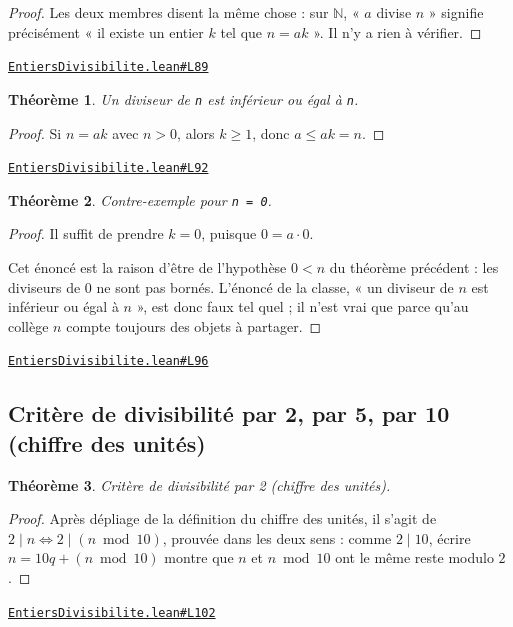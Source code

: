 \documentclass[11pt,a4paper]{article}
\theoremstyle{definition}
\theoremstyle{plain}
\newtheorem{theoreme}{Théorème}
\newcommand{\source}[2]{\par\smallskip\noindent\hfill{\footnotesize\href{#1}{\texttt{#2}}}\par\smallskip}
\begin{document}
\begin{proof}
Les deux membres disent la même chose : sur $\mathbb{N}$, « $a$ divise $n$ » signifie
précisément « il existe un entier $k$ tel que $n = ak$ ». Il n'y a rien à vérifier.
\end{proof}
\source{https://github.com/Commutator-IO/learn-lean/blob/main/cours/01-college/01-nombres-et-calculs/EntiersDivisibilite.lean\#L89}{EntiersDivisibilite.lean\#L89}

\begin{theoreme}
Un diviseur de \texttt{n} est inférieur ou égal à \texttt{n}.
\end{theoreme}

\begin{proof}
Si $n = ak$ avec $n > 0$,
alors $k \ge 1$, donc $a \le ak = n$.
\end{proof}
\source{https://github.com/Commutator-IO/learn-lean/blob/main/cours/01-college/01-nombres-et-calculs/EntiersDivisibilite.lean\#L92}{EntiersDivisibilite.lean\#L92}

\begin{theoreme}
Contre-exemple pour \texttt{n = 0}.
\end{theoreme}

\begin{proof}
Il suffit de prendre $k = 0$, puisque $0 = a \cdot 0$.

Cet énoncé est la raison d'être de l'hypothèse $0 < n$ du théorème précédent : les
diviseurs de $0$ ne sont pas bornés. L'énoncé de la classe, « un diviseur de $n$ est
inférieur ou égal à $n$ », est donc faux tel quel ; il n'est vrai que parce qu'au
collège $n$ compte toujours des objets à partager.
\end{proof}
\source{https://github.com/Commutator-IO/learn-lean/blob/main/cours/01-college/01-nombres-et-calculs/EntiersDivisibilite.lean\#L96}{EntiersDivisibilite.lean\#L96}

\subsection{Critère de divisibilité par 2, par 5, par 10 (chiffre des unités)}

\begin{theoreme}
Critère de divisibilité par 2 (chiffre des unités).
\end{theoreme}

\begin{proof}
Après dépliage de la définition du chiffre des unités, il s'agit de
$2 \mid n \iff 2 \mid (n \bmod 10)$, prouvée dans les deux sens : comme $2 \mid 10$, écrire $n = 10q + (n \bmod 10)$ montre que $n$ et
$n \bmod 10$ ont le même reste modulo $2$.
\end{proof}
\source{https://github.com/Commutator-IO/learn-lean/blob/main/cours/01-college/01-nombres-et-calculs/EntiersDivisibilite.lean\#L102}{EntiersDivisibilite.lean\#L102}
\end{document}
